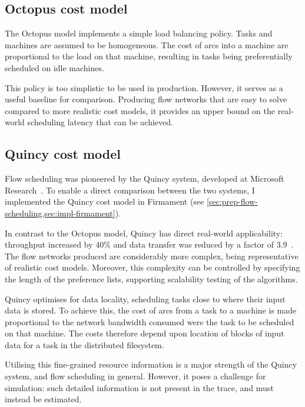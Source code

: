 \subsection{Octopus cost model} \label{sec:eval-benchmark-strategy-octopus}

The Octopus model implements a simple load balancing policy. Tasks and machines are assumed to be homogeneous. The cost of arcs into a machine are proportional to the load on that machine, resulting in tasks being preferentially scheduled on idle machines. 

This policy is too simplistic to be used in production. However, it serves as a useful baseline for comparison. Producing flow networks that are easy to solve compared to more realistic cost models, it provides an upper bound on the real-world scheduling latency that can be achieved.

\subsection{Quincy cost model} \label{sec:eval-benchmark-strategy-quincy}

Flow scheduling was pioneered by the Quincy system, developed at Microsoft Research~\cite{Isard:2009}. To enable a direct comparison between the two systems, I implemented the Quincy cost model in Firmament (see \cref{sec:prep-flow-scheduling,sec:impl-firmament}).

In contrast to the Octopus model, Quincy has direct real-world applicability: throughput increased by 40\% and data transfer was reduced by a factor of 3.9~\cite{Isard:2009}. The flow networks produced are considerably more complex, being representative of realistic cost models. Moreover, this complexity can be controlled by specifying the length of the preference lists, supporting scalability testing of the algorithms.

Quincy optimises for data locality, scheduling tasks close to where their input data is stored. To achieve this, the cost of arcs from a task to a machine is made proportional to the network bandwidth consumed were the task to be scheduled on that machine. The costs therefore depend upon location of blocks of input data for a task in the distributed filesystem.

Utilising this fine-grained resource information is a major strength of the Quincy system, and flow scheduling in general. However, it poses a challenge for simulation: such detailed information is not present in the trace, and must instead be estimated. 


